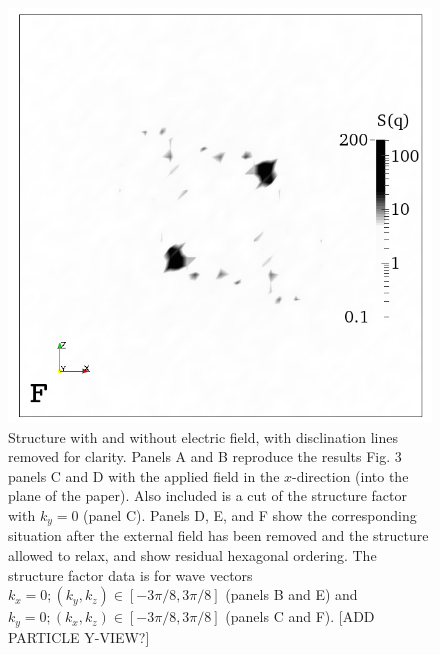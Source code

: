 \documentclass[12pt,twoside]{article}
\begin{document}
\begin{figure}[!h]
\begin{center}
\includegraphics[width=0.32\columnwidth]{sq_y_run1342.png}
\end{center}
\caption{Structure with and without electric field, with disclination lines
removed for clarity. Panels A and B reproduce the results Fig. 3 panels
C and D with the applied field in the $x$-direction (into the plane of the
paper). Also included is a cut of the structure factor with $k_y = 0$
(panel C). Panels D, E, and F show the corresponding situation after the
external field has been removed and the structure allowed to relax,
and show residual hexagonal ordering. The structure factor data is for wave
vectors $k_x = 0; (k_y, k_z) \in [-3\pi/8 , 3\pi/8]$ (panels B and E) and
$k_y = 0; (k_x, k_z) \in [-3\pi/8, 3\pi/8]$ (panels C and F).
[ADD PARTICLE Y-VIEW?]}
\end{figure}

\newpage
\end{document}
